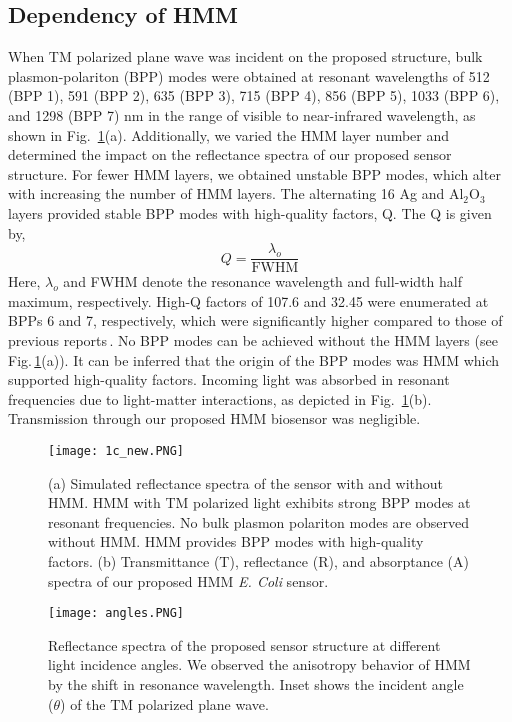 \documentclass[conference]{IEEEtran}
\begin{document}
\subsection{Dependency of HMM}
When TM polarized plane wave was incident on the proposed structure, bulk plasmon-polariton (BPP) modes were obtained at resonant wavelengths of 512 (BPP 1), 591 (BPP 2), 635 (BPP 3), 715 (BPP 4), 856 (BPP 5), 1033 (BPP 6), and 1298 (BPP 7) nm in the range of visible to near-infrared wavelength, as shown in Fig.~\ref{No HMM}(a). Additionally, we varied the HMM layer number and determined the impact on the reflectance spectra of our proposed sensor structure. For fewer HMM layers, we obtained unstable BPP modes, which alter with increasing the number of HMM layers. The alternating 16 Ag and Al$_2$O$_3$ layers provided stable BPP modes with high-quality factors, Q. The Q is given by,
\begin{equation}
    Q = \frac{\lambda_o}{\mbox{FWHM}}
    \label{Q}
\end{equation}
Here, $\lambda_o$ and FWHM denote the resonance wavelength and full-width half maximum, respectively. High-Q factors of 107.6 and 32.45 were enumerated at BPPs 6 and 7, respectively, which were significantly higher compared to those of previous reports\,\cite{Chowdhury, Ahmed}. No BPP modes can be achieved without the HMM layers (see Fig.\,\ref{No HMM}(a)). It can be inferred that the origin of the BPP modes was HMM which supported high-quality factors. Incoming light was absorbed in resonant frequencies due to light-matter interactions, as depicted in Fig.~\ref{No HMM}(b). Transmission through our proposed HMM biosensor was negligible.  
\begin{figure}[ht]
\centering
\texttt{[image: 1c\_new.PNG]}
\caption{(a) Simulated reflectance spectra of the sensor with and without HMM. HMM with TM polarized light exhibits strong BPP modes at resonant frequencies. No bulk plasmon polariton modes are observed without HMM. HMM provides BPP modes with high-quality factors. (b) Transmittance (T), reflectance (R), and absorptance (A) spectra of our proposed HMM \textit{E. Coli} sensor.}
\label{No HMM}
\end{figure}
\begin{figure}[ht]
\centering
\texttt{[image: angles.PNG]}
\caption{Reflectance spectra of the proposed sensor structure at different light incidence angles. We observed the anisotropy behavior of HMM by the shift in resonance wavelength. Inset shows the incident angle ($\theta$) of the TM polarized plane wave.}
\label{angles}
\end{figure}
\end{document}
